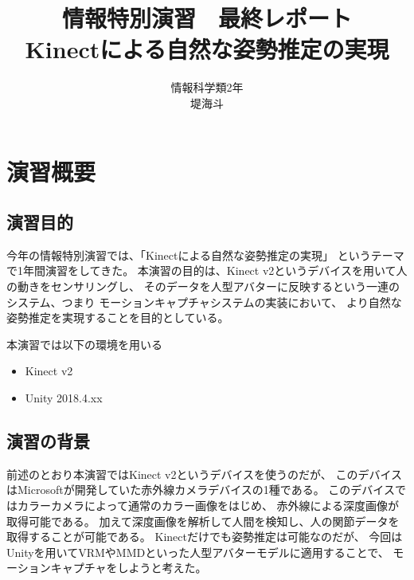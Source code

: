 \documentclass[a4j]{jsarticle}
\begin{document}
\begin{titlepage}
  \title{情報特別演習　最終レポート\\ Kinectによる自然な姿勢推定の実現}
  \author{情報科学類2年\\堤海斗}
  \maketitle
  \thispagestyle{empty}
  
\end{titlepage}

\section{演習概要}

\subsection{演習目的}

今年の情報特別演習では、「Kinectによる自然な姿勢推定の実現」
というテーマで1年間演習をしてきた。
本演習の目的は、Kinect v2というデバイスを用いて人の動きをセンサリングし、
そのデータを人型アバターに反映するという一連のシステム、つまり
モーションキャプチャシステムの実装において、
より自然な姿勢推定を実現することを目的としている。

本演習では以下の環境を用いる

\begin{itemize}
  \item Kinect v2
  \item Unity 2018.4.xx 
\end{itemize}

\subsection{演習の背景}

前述のとおり本演習ではKinect v2というデバイスを使うのだが、
このデバイスはMicrosoftが開発していた赤外線カメラデバイスの1種である。
このデバイスではカラーカメラによって通常のカラー画像をはじめ、
赤外線による深度画像が取得可能である。
加えて深度画像を解析して人間を検知し、人の関節データを取得することが可能である。
Kinectだけでも姿勢推定は可能なのだが、
今回はUnityを用いてVRMやMMDといった人型アバターモデルに適用することで、
モーションキャプチャをしようと考えた。
\end{document}
